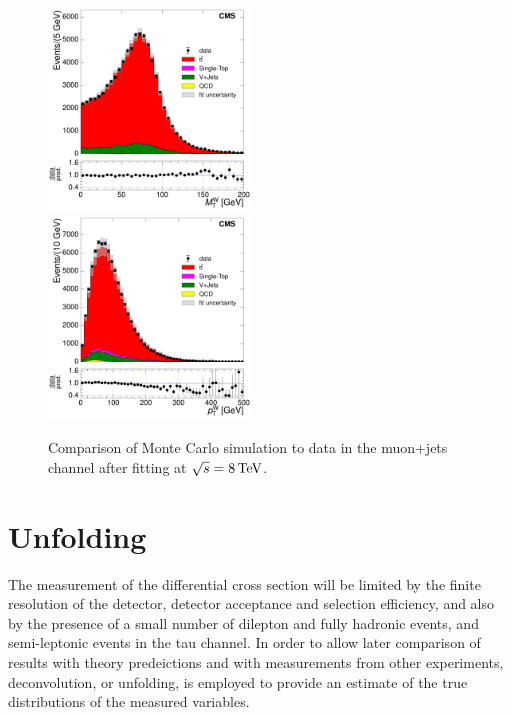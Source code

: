 \begin{figure}[hbtp]
     \includegraphics[width=0.48\textwidth]{Chapters/04_Analysis/04b_XSections/images/control_plots/after_fit/8TeV/MuPlusJets_patType1CorrectedPFMet_MT_2orMoreBtags_with_ratio.pdf}\\     
	 \includegraphics[width=0.48\textwidth]{Chapters/04_Analysis/04b_XSections/images/control_plots/after_fit/8TeV/MuPlusJets_patType1CorrectedPFMet_WPT_2orMoreBtags_with_ratio.pdf}\hfill
	 \caption{Comparison of Monte Carlo simulation to data in the muon+jets channel after fitting at
	 $\sqrt{s}=8\,\text{Te\hspace{-.08em}V}$.}
     \label{fig:data_mc_comparison_after_fit_8TeV_muon}
\end{figure}

\FloatBarrier


\section{Unfolding}
\label{ss:unfolding}

The measurement of the differential cross section will be limited by the finite resolution of the detector,
detector acceptance and selection efficiency, and also by the presence of a small number of
dilepton and fully hadronic \ttbar events, and semi-leptonic events in the tau channel. In order to allow
later comparison of results with theory predeictions and with measurements from other experiments,
deconvolution, or unfolding, is employed to provide an estimate of the true distributions of the measured
variables.


